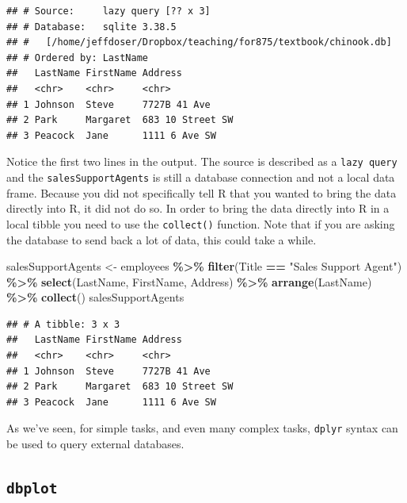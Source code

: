 \documentclass[
]{krantz}
\newenvironment{Shaded}{\begin{snugshade}}{\end{snugshade}}
\newcommand{\KeywordTok}[1]{\textcolor[rgb]{0.13,0.29,0.53}{\textbf{#1}}}
\newcommand{\NormalTok}[1]{#1}
\newcommand{\OperatorTok}[1]{\textcolor[rgb]{0.81,0.36,0.00}{\textbf{#1}}}
\newcommand{\StringTok}[1]{\textcolor[rgb]{0.31,0.60,0.02}{#1}}
\begin{document}
\begin{verbatim}
## # Source:     lazy query [?? x 3]
## # Database:   sqlite 3.38.5
## #   [/home/jeffdoser/Dropbox/teaching/for875/textbook/chinook.db]
## # Ordered by: LastName
##   LastName FirstName Address         
##   <chr>    <chr>     <chr>           
## 1 Johnson  Steve     7727B 41 Ave    
## 2 Park     Margaret  683 10 Street SW
## 3 Peacock  Jane      1111 6 Ave SW
\end{verbatim}

Notice the first two lines in the output. The source is described as a \texttt{lazy\ query} and the \texttt{salesSupportAgents} is still a database connection and not a local data frame. Because you did not specifically tell R that you wanted to bring the data directly into R, it did not do so. In order to bring the data directly into R in a local tibble you need to use the \texttt{collect()} function. Note that if you are asking the database to send back a lot of data, this could take a while.

\begin{Shaded}
\begin{Highlighting}[]
\NormalTok{salesSupportAgents \textless{}{-}}\StringTok{ }\NormalTok{employees }\OperatorTok{\%\textgreater{}\%}\StringTok{ }
\StringTok{  }\KeywordTok{filter}\NormalTok{(Title }\OperatorTok{==}\StringTok{ "Sales Support Agent"}\NormalTok{) }\OperatorTok{\%\textgreater{}\%}\StringTok{ }
\StringTok{  }\KeywordTok{select}\NormalTok{(LastName, FirstName, Address) }\OperatorTok{\%\textgreater{}\%}\StringTok{ }
\StringTok{  }\KeywordTok{arrange}\NormalTok{(LastName) }\OperatorTok{\%\textgreater{}\%}\StringTok{ }
\StringTok{  }\KeywordTok{collect}\NormalTok{()}
\NormalTok{salesSupportAgents}
\end{Highlighting}
\end{Shaded}

\begin{verbatim}
## # A tibble: 3 x 3
##   LastName FirstName Address         
##   <chr>    <chr>     <chr>           
## 1 Johnson  Steve     7727B 41 Ave    
## 2 Park     Margaret  683 10 Street SW
## 3 Peacock  Jane      1111 6 Ave SW
\end{verbatim}

As we've seen, for simple tasks, and even many complex tasks, \texttt{dplyr} syntax can be used to query external databases.

\hypertarget{dbplot}{%
\subsection{\texorpdfstring{\texttt{dbplot}}{dbplot}}\label{dbplot}}
\end{document}
